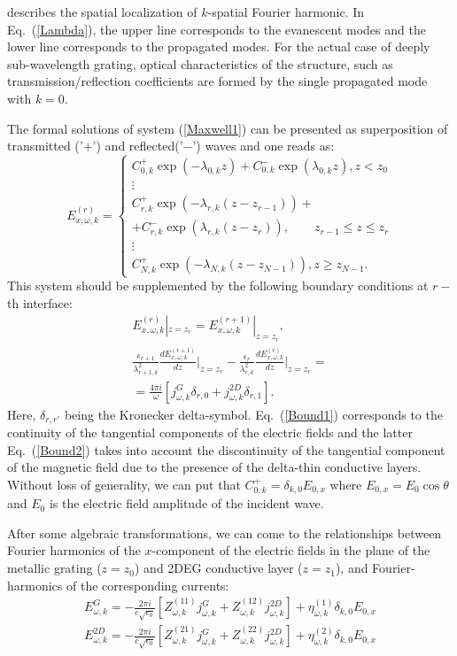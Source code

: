 \documentclass[%
 reprint,
 amsmath,amssymb,
 aps,
]{revtex4-2}
\begin{document}
describes the spatial localization of $k$-spatial Fourier harmonic. In Eq.~(\ref{Lambda}), the upper line corresponds to the evanescent modes and the lower line corresponds to the propagated modes. For the actual case of deeply sub-wavelength grating,  optical characteristics of the structure, such as transmission/reflection coefficients are formed by the single propagated mode with $k=0$.

The formal solutions of system (\ref{Maxwell1}) can be presented as superposition of transmitted ('$+$') and reflected('$-$') waves and one reads as:
\begin{equation}
\label{sol}
E^{(r)}_{x,\omega,k}=\left\{
\begin{array}{l}
C^{+}_{0,k}\exp(-\lambda_{0,k}z)+C^{-}_{0,k}\exp(\lambda_{0,k}z),  z<z_{0} \\
\vdots\\
C^{+}_{r,k}\exp(-\lambda_{r,k}(z-z_{r-1}))+\\
+C^{-}_{r,k}\exp(\lambda_{r,k}(z-z_{r})),  \quad\quad z_{r-1}\leq z\leq z_{r}\\
\vdots\\
C^{+}_{N,k}\exp(-\lambda_{N,k}(z-z_{N-1})),  z\geq z_{N-1}.
\end{array}
\right.
\end{equation}
This system should be supplemented by the following boundary conditions at $r-$th interface:
\begin{align}
\label{Bound1} E^{(r)}_{x,\omega,k}|_{z=z_{r}}=E^{(r+1)}_{x,\omega,k}|_{z=z_{r}},\\
\frac{\epsilon_{r+1}}{\lambda^{2}_{r+1,k}}\frac{dE^{(r+1)}_{x,\omega,k}}{dz}\Big|_{z=z_{r}}\!-\!\frac{\epsilon_{r}}{\lambda^{2}_{r,k}}\frac{d E^{(r)}_{x,\omega,k}}{dz}\Big|_{z=z_{r}}\!=\nonumber \\
=\frac{4\pi i}{\omega}[j^{G}_{\omega,k}\delta_{r,0}+j^{2D}_{\omega,k}\delta_{r,1}].
  \label{Bound2}
\end{align}
Here, $\delta_{r,r'}$ being the Kronecker delta-symbol.
Eq.~(\ref{Bound1}) corresponds to the continuity of the tangential components of the electric fields and the latter Eq.~(\ref{Bound2}) takes into account the discontinuity of the tangential component of the magnetic field due to the presence of the delta-thin conductive layers.
Without loss of generality, we can put that $C^{+}_{0,k}=\delta_{k,0}E_{0,x}$ where $E_{0,x}=E_{0}\cos{\theta}$ and $E_{0}$ is the electric field amplitude of the incident wave.

After some algebraic transformations, we can come to the relationships between Fourier harmonics of the $x$-component of the electric fields in the plane of the metallic grating ($z=z_0$) and 2DEG conductive layer ($z=z_1$), and Fourier-harmonics of the corresponding currents:
\begin{align}\label{Fur_Bas}
E^{G}_{\omega,k}=-\frac{2\pi i}{c\sqrt{\epsilon_{0}}}[Z^{(11)}_{\omega,k}j^{G}_{\omega,k}+Z^{(12)}_{\omega,k}j^{2D}_{\omega,k}]+\eta^{(1)}_{\omega,k}\delta_{k,0}E_{0,x}\nonumber\\
E^{2D}_{\omega,k}=-\frac{2\pi i}{c\sqrt{\epsilon_{0}}}[Z^{(21)}_{\omega,k}j^{G}_{\omega,k}+Z^{(22)}_{\omega,k}j^{2D}_{\omega,k}]+\eta^{(2)}_{\omega,k}\delta_{k,0}E_{0,x}
\end{align}
\end{document}
